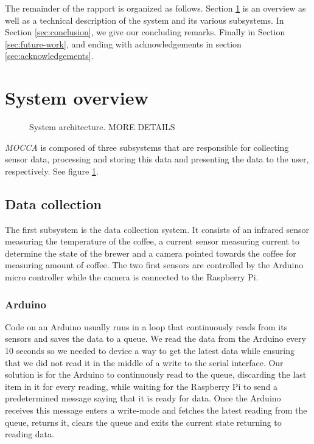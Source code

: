 \documentclass[12pt,a4paper,oneside,article]{memoir}
\numberwithin{equation}{chapter}
\begin{document}
The remainder of the rapport is organized as follows. Section 
\ref{sec:system-overview} is an overview as well as a technical
description of the system and its various subsystems. In Section
\ref{sec:conclusion}, we give our concluding remarks. Finally in Section 
\ref{sec:future-work}, and ending with acknowledgements in section 
\ref{sec:acknowledgements}.

\section{System overview}\label{sec:system-overview}
\begin{figure}[h]
  \centerfloat{}
  \scalebox{.75}{}
  \caption{System architecture. MORE DETAILS}\label{fig:architecture}
\end{figure}
\textit{MOCCA} is composed of three subsystems that are responsible for
collecting sensor data, processing and storing this data and presenting the data
to the user, respectively. See figure \ref{fig:architecture}.

\subsection{Data collection}\label{sec:data-collection}
The first subsystem is the data collection system. It consists of an 
infrared sensor measuring the temperature of the coffee, a current sensor 
measuring current to determine the state of the brewer and a camera pointed 
towards the coffee for measuring amount of coffee. The two first sensors are 
controlled by the Arduino micro controller while the camera is connected to the 
Raspberry Pi.

\subsubsection{Arduino}\label{sec:arduino}
Code on an Arduino usually runs in a loop that continuously reads from 
its sensors and saves the data to a queue. We read the data from the 
Arduino every 10 seconds so we needed to device a way to get the latest data 
while ensuring that we did not read it in the middle of a write to the serial 
interface. Our solution is for the Arduino to continuously read to the queue, 
discarding the last item in it for every reading, while waiting for the 
Raspberry Pi to send a predetermined message saying that it is ready for 
data. Once the Arduino receives this message enters a write-mode and fetches 
the latest reading from the queue, returns it, clears the queue and exits the 
current state returning to reading data. 
\end{document}
